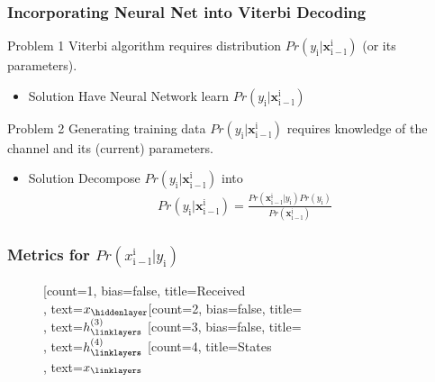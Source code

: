 \documentclass[10pt,tgadventor, onlymath]{beamer}
\begin{document}
\begin{frame}
	\frametitle{Incorporating Neural Net into Viterbi Decoding}
	\begin{block}{Problem 1}
	Viterbi algorithm requires distribution $ Pr(y_{\mathrm{i}}|\mathbf{x}_{\mathrm{i-l}}
	^{\mathrm{i}})$ (or its parameters).
	\begin{itemize}
			\item \begin{block}{Solution}
Have Neural Network learn $ Pr(y_{\mathrm{i}}|\mathbf{x}_{\mathrm{i-l}}^{\mathrm{i}})$
		\end{block}
\end{itemize}		
	\end{block}


		\begin{block}{Problem 2}
Generating training data $ Pr(y_{\mathrm{i}}|\mathbf{x}_{\mathrm{i-l}}^{\mathrm{i}})$ requires knowledge of the channel and its (current) parameters.
\begin{itemize}
\item 
		\begin{block}{Solution}
		Decompose $ Pr(y_{\mathrm{i}}|\mathbf{x}_{\mathrm{i-l}}^{\mathrm{i}})$ into 
		\begin{gather}
		Pr(y_{\mathrm{i}}|\mathbf{x}_{\mathrm{i-l}}^{\mathrm{i}}) = \frac{Pr(\mathbf{x}_{\mathrm{i-l}}^{\mathrm{i}}|y_{\mathrm{i}})Pr(y_{\mathrm{i}})}{Pr(\mathbf{x}_{\mathrm{i-l}}^{\mathrm{i}})}
		\end{gather}
		\end{block}
\end{itemize}
		\end{block}


\end{frame}


\begin{frame}[fragile]
	\frametitle{Metrics for $Pr(x_{\mathrm{i-l}}^{\mathrm{i}}|y_{\mathrm{i}})$}
	\begin{figure}
		\begin{neuralnetwork}[height=4, nodespacing=10mm, layerspacing=15mm]
		\newcommand{\x}[2]{$x_#2$}
		\newcommand{\y}[2]{$\hat{y}_#2$}
		\newcommand{\hfirst}[2]{\small $h^{(1)}_#2$}
		\newcommand{\hsecond}[2]{\small $h^{(2)}_#2$}
		\newcommand{\hthird}[2]{\small $h^{(3)}_#2$}
		\newcommand{\hfourth}[2]{\small $h^{(4)}_#2$}
		[count=1, bias=false, title=Received\\, text=\x]
		\hiddenlayer[count=2, bias=false, title=\\, text=\hthird] \linklayers
		\hiddenlayer[count=3, bias=false, title=\\, text=\hfourth] \linklayers
		\outputlayer[count=4, title=States\\, text=\x] \linklayers
	    \end{neuralnetwork}
	\end{figure}
\end{frame}
\end{document}
